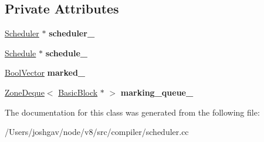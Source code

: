 \subsection*{Private Attributes}
\begin{DoxyCompactItemize}
\item 
\hyperlink{classv8_1_1internal_1_1compiler_1_1_scheduler}{Scheduler} $\ast$ {\bfseries scheduler\+\_\+}\hypertarget{classv8_1_1internal_1_1compiler_1_1_schedule_late_node_visitor_a82b9f86f6a1aa5c5ef57bfa470952aeb}{}\label{classv8_1_1internal_1_1compiler_1_1_schedule_late_node_visitor_a82b9f86f6a1aa5c5ef57bfa470952aeb}

\item 
\hyperlink{classv8_1_1internal_1_1compiler_1_1_schedule}{Schedule} $\ast$ {\bfseries schedule\+\_\+}\hypertarget{classv8_1_1internal_1_1compiler_1_1_schedule_late_node_visitor_a41d3e29b4fbf9338cfe162105bff4dcd}{}\label{classv8_1_1internal_1_1compiler_1_1_schedule_late_node_visitor_a41d3e29b4fbf9338cfe162105bff4dcd}

\item 
\hyperlink{classv8_1_1internal_1_1_zone_vector}{Bool\+Vector} {\bfseries marked\+\_\+}\hypertarget{classv8_1_1internal_1_1compiler_1_1_schedule_late_node_visitor_a99b214338deee73137b9611934d33411}{}\label{classv8_1_1internal_1_1compiler_1_1_schedule_late_node_visitor_a99b214338deee73137b9611934d33411}

\item 
\hyperlink{classv8_1_1internal_1_1_zone_deque}{Zone\+Deque}$<$ \hyperlink{classv8_1_1internal_1_1compiler_1_1_basic_block}{Basic\+Block} $\ast$ $>$ {\bfseries marking\+\_\+queue\+\_\+}\hypertarget{classv8_1_1internal_1_1compiler_1_1_schedule_late_node_visitor_ad9c079634abdbd8d559ca8d9bc9cc877}{}\label{classv8_1_1internal_1_1compiler_1_1_schedule_late_node_visitor_ad9c079634abdbd8d559ca8d9bc9cc877}

\end{DoxyCompactItemize}


The documentation for this class was generated from the following file\+:\begin{DoxyCompactItemize}
\item 
/\+Users/joshgav/node/v8/src/compiler/scheduler.\+cc\end{DoxyCompactItemize}
